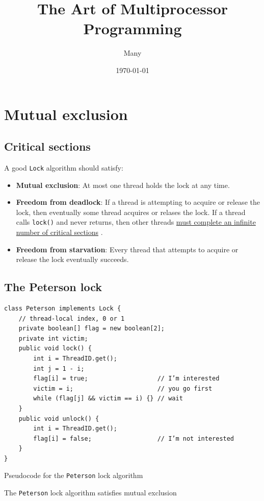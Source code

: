\documentclass[11pt]{article}
\author{Many}
\date{\today}
\title{The Art of Multiprocessor Programming}
\begin{document}
\maketitle
\tableofcontents

\section{Mutual exclusion}
\label{sec:org8ca5ae0}
\subsection{Critical sections}
\label{sec:org6d321ca}
A good \texttt{Lock} algorithm should satisfy:
\begin{itemize}
\item \textbf{Mutual exclusion}: At most one thread holds the lock at any time.
\item \textbf{Freedom from deadlock}: If a thread is attempting to acquire or release the lock, then eventually
some thread acquires or relases the lock. If a thread calls \texttt{lock()} and never returns, then other
threads \uline{must complete an infinite number of critical sections} .
\item \textbf{Freedom from starvation}: Every thread that attempts to acquire or release the lock eventually succeeds.
\end{itemize}
\subsection{The Peterson lock}
\label{sec:org97e7637}
\begin{listing}[htbp]
\begin{verbatim}
class Peterson implements Lock {
    // thread-local index, 0 or 1
    private boolean[] flag = new boolean[2];
    private int victim;
    public void lock() {
        int i = ThreadID.get();
        int j = 1 - i;
        flag[i] = true;                   // I’m interested
        victim = i;                       // you go first
        while (flag[j] && victim == i) {} // wait
    }
    public void unlock() {
        int i = ThreadID.get();
        flag[i] = false;                  // I’m not interested
    }
}
\end{verbatim}
\caption{\label{}Pseudocode for the \texttt{Peterson} lock algorithm}
\end{listing}

\begin{lemma}[]
The \texttt{Peterson} lock algorithm satisfies mutual exclusion
\end{lemma}
\end{document}
